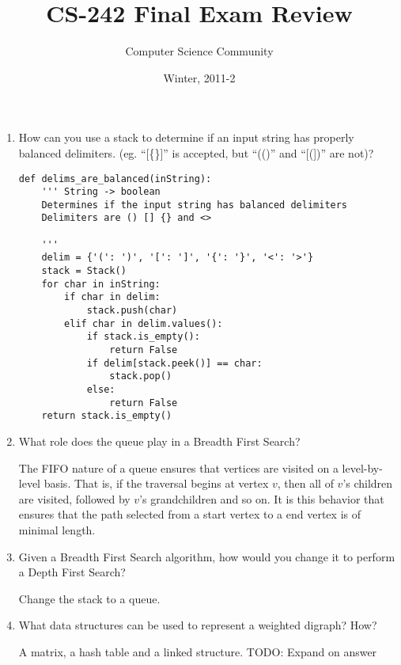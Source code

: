 \documentclass[11pt]{article}
\author{Computer Science Community}
\title{CS-242 Final Exam Review}
\date{Winter, 2011-2}
\makeatletter
\newenvironment{answer}{\large\lstset{basicstyle=\large}\color{white}}{}
\newenvironment{answer}{\large\lstset{basicstyle=\large}\color{red}}{}
\let\thetitle\@title
\let\thedate\@date
\makeatother
\begin{document}
\noindent{\Large \thetitle \hfill \thedate}

\begin{enumerate}

\item How can you use a stack to determine if an input string has
      properly balanced delimiters. (eg. ``[\{\}]'' is accepted, but ``(()''
      and ``[(])'' are not)?

    \begin{answer}
    \begin{lstlisting} 
def delims_are_balanced(inString):
    ''' String -> boolean
    Determines if the input string has balanced delimiters
    Delimiters are () [] {} and <>  
    
    '''
    delim = {'(': ')', '[': ']', '{': '}', '<': '>'}
    stack = Stack()
    for char in inString:
        if char in delim:
            stack.push(char)
        elif char in delim.values():
            if stack.is_empty():
                return False
            if delim[stack.peek()] == char:
                stack.pop()
            else:
                return False
    return stack.is_empty()
    \end{lstlisting}
    \end{answer}

\item What role does the queue play in a Breadth First Search?

    \begin{answer}
    The FIFO nature of a queue ensures that vertices are visited on a level-by-level basis. That is, if the traversal 
    begins at vertex $v$, then all of $v$'s children are visited, followed by $v$'s grandchildren and so on. It is
    this behavior that ensures that the path selected from a start vertex to a end vertex is of minimal length.
    \end{answer}

\item Given a Breadth First Search algorithm, how would you change it to
      perform a Depth First Search?

    \begin{answer}
    Change the stack to a queue.
    \end{answer}

\item What data structures can be used to represent a weighted  digraph? How?

    \begin{answer}
    A matrix, a hash table and a linked structure.
    \Huge TODO: Expand on answer
    \end{answer}


\end{enumerate}
\end{document}
